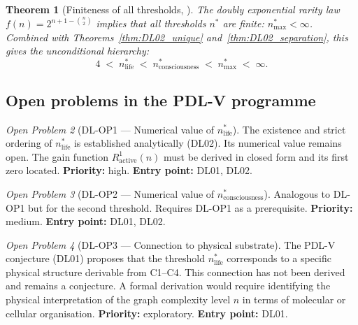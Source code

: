 \documentclass[11pt,a4paper]{article}
\theoremstyle{plain}
\newtheorem{theorem}{Theorem}[section]
\theoremstyle{definition}
\theoremstyle{remark}
\newtheorem{openproblem}[theorem]{Open Problem}
\begin{document}
\begin{theorem}[Finiteness of all thresholds, \cite{DL02}]
\label{thm:DL02_finiteness}
The doubly exponential rarity law $f(n) = 2^{n+1-\binom{n}{2}}$ implies that all thresholds $n^*$ are finite: $n^*_{\mathrm{max}} < \infty$. Combined with Theorems~\ref{thm:DL02_unique} and~\ref{thm:DL02_separation}, this gives the unconditional hierarchy:
\begin{equation}
4 \;<\; n^*_{\mathrm{life}} \;<\; n^*_{\mathrm{consciousness}} \;<\; n^*_{\mathrm{max}} \;<\; \infty.
\end{equation}
\end{theorem}

\subsection{Open problems in the PDL-V programme}

\begin{openproblem}[DL-OP1 --- Numerical value of $n^*_{\mathrm{life}}$]
\label{op:DL_nlife}
The existence and strict ordering of $n^*_{\mathrm{life}}$ is established analytically (DL02). Its numerical value remains open. The gain function $R^1_{\mathrm{active}}(n)$ must be derived in closed form and its first zero located. \textbf{Priority:} high. \textbf{Entry point:} DL01, DL02.
\end{openproblem}

\begin{openproblem}[DL-OP2 --- Numerical value of $n^*_{\mathrm{consciousness}}$]
\label{op:DL_nconsciousness}
Analogous to DL-OP1 but for the second threshold. Requires DL-OP1 as a prerequisite. \textbf{Priority:} medium. \textbf{Entry point:} DL01, DL02.
\end{openproblem}

\begin{openproblem}[DL-OP3 --- Connection to physical substrate]
\label{op:DL_substrate}
The PDL-V conjecture (DL01) proposes that the threshold $n^*_{\mathrm{life}}$ corresponds to a specific physical structure derivable from C1--C4. This connection has not been derived and remains a conjecture. A formal derivation would require identifying the physical interpretation of the graph complexity level $n$ in terms of molecular or cellular organisation. \textbf{Priority:} exploratory. \textbf{Entry point:} DL01.
\end{openproblem}

\clearpage



\end{document}
